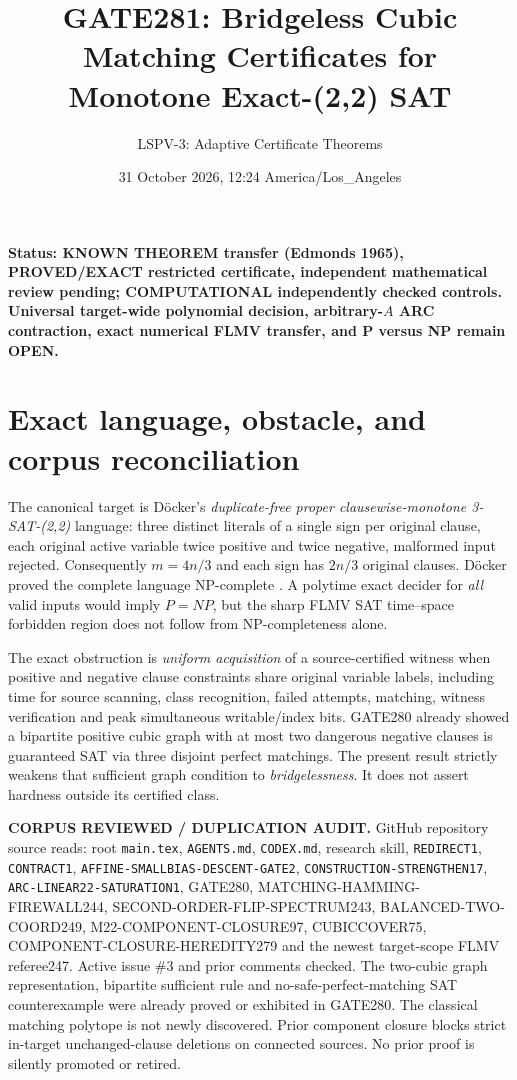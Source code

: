 \documentclass[11pt]{article}
\title{GATE281: Bridgeless Cubic Matching Certificates for Monotone Exact-(2,2) SAT}
\author{LSPV-3: Adaptive Certificate Theorems}
\date{31 October 2026, 12:24 America/Los\_Angeles}
\begin{document}
\maketitle
\noindent\textbf{Status: KNOWN THEOREM transfer (Edmonds 1965), PROVED/EXACT restricted certificate, independent mathematical review pending; COMPUTATIONAL independently checked controls. Universal target-wide polynomial decision, arbitrary-$A$ ARC contraction, exact numerical FLMV transfer, and P versus NP remain OPEN.}

\section{Exact language, obstacle, and corpus reconciliation}
The canonical target is D\"ocker's \emph{duplicate-free proper clausewise-monotone 3-SAT-(2,2)} language: three distinct literals of a single sign per original clause, each original active variable twice positive and twice negative, malformed input rejected. Consequently $m=4n/3$ and each sign has $2n/3$ original clauses. D\"ocker proved the complete language NP-complete \cite{docker}. A polytime exact decider for \emph{all} valid inputs would imply $P=NP$, but the sharp FLMV SAT time--space forbidden region does not follow from NP-completeness alone.

The exact obstruction is \emph{uniform acquisition} of a source-certified witness when positive and negative clause constraints share original variable labels, including time for source scanning, class recognition, failed attempts, matching, witness verification and peak simultaneous writable/index bits. GATE280 already showed a bipartite positive cubic graph with at most two dangerous negative clauses is guaranteed SAT via three disjoint perfect matchings. The present result strictly weakens that sufficient graph condition to \emph{bridgelessness}. It does not assert hardness outside its certified class.

\noindent\textbf{CORPUS REVIEWED / DUPLICATION AUDIT.} GitHub repository source reads: root \texttt{main.tex}, \texttt{AGENTS.md}, \texttt{CODEX.md}, research skill, \texttt{REDIRECT1}, \texttt{CONTRACT1}, \texttt{AFFINE-SMALLBIAS-DESCENT-GATE2}, \texttt{CONSTRUCTION-STRENGTHEN17}, \texttt{ARC-LINEAR22-SATURATION1}, GATE280, MATCHING-HAMMING-FIREWALL244, SECOND-ORDER-FLIP-SPECTRUM243, BALANCED-TWO-COORD249, M22-COMPONENT-CLOSURE97, CUBICCOVER75, COMPONENT-CLOSURE-HEREDITY279 and the newest target-scope FLMV referee247. Active issue \#3 and prior comments checked. The two-cubic graph representation, bipartite sufficient rule and no-safe-perfect-matching SAT counterexample were already proved or exhibited in GATE280. The classical matching polytope is not newly discovered. Prior component closure blocks strict in-target unchanged-clause deletions on connected sources. No prior proof is silently promoted or retired.
\end{document}
